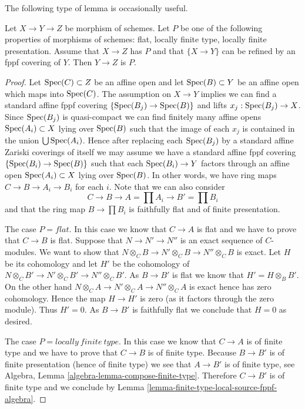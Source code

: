 \noindent
The following type of lemma is occasionally useful.

\begin{lemma}
\label{lemma-curiosity}
Let $X \to Y \to Z$ be morphism of schemes.
Let $P$ be one of the following properties of morphisms of schemes:
flat, locally finite type, locally finite presentation.
Assume that $X \to Z$ has $P$ and that $\{X \to Y\}$
can be refined by an fppf covering of $Y$. Then $Y \to Z$ is $P$.
\end{lemma}

\begin{proof}
Let $\mathop{\mathrm{Spec}}(C) \subset Z$ be an affine open and let
$\mathop{\mathrm{Spec}}(B) \subset Y$ be an affine open which maps into
$\mathop{\mathrm{Spec}}(C)$. The assumption on $X \to Y$ implies we can
find a standard affine fppf covering $\{\mathop{\mathrm{Spec}}(B_j) \to \mathop{\mathrm{Spec}}(B)\}$
and lifts $x_j : \mathop{\mathrm{Spec}}(B_j) \to X$. Since $\mathop{\mathrm{Spec}}(B_j)$
is quasi-compact we can find finitely many affine opens
$\mathop{\mathrm{Spec}}(A_i) \subset X$ lying over $\mathop{\mathrm{Spec}}(B)$
such that the image of each $x_j$
is contained in the union $\bigcup \mathop{\mathrm{Spec}}(A_i)$. Hence after
replacing each $\mathop{\mathrm{Spec}}(B_j)$ by a standard affine Zariski coverings
of itself we may assume we have a
standard affine fppf covering $\{\mathop{\mathrm{Spec}}(B_i) \to \mathop{\mathrm{Spec}}(B)\}$
such that each $\mathop{\mathrm{Spec}}(B_i) \to Y$ factors through an affine
open $\mathop{\mathrm{Spec}}(A_i) \subset X$ lying over $\mathop{\mathrm{Spec}}(B)$.
In other words, we have ring maps $C \to B \to A_i \to B_i$ for each $i$.
Note that we can also consider
$$
C \to B \to A = \prod A_i \to B' = \prod B_i
$$
and that the ring map $B \to \prod B_i$ is faithfully flat and
of finite presentation.

\medskip\noindent
The case $P = flat$. In this case we know that $C \to A$ is flat
and we have to prove that $C \to B$ is flat. Suppose that
$N \to N' \to N''$ is an exact sequence of $C$-modules. We want to
show that $N \otimes_C B \to N' \otimes_C B \to N'' \otimes_C B$
is exact. Let $H$ be its cohomology and let $H'$ be the cohomology
of $N \otimes_C B' \to N' \otimes_C B' \to N'' \otimes_C B'$. As
$B \to B'$ is flat we know that $H' = H \otimes_B B'$. On the other hand
$N \otimes_C A \to N' \otimes_C A \to N'' \otimes_C A$
is exact hence has zero cohomology. Hence the map
$H \to H'$ is zero (as it factors through the zero module).
Thus $H' = 0$. As $B \to B'$ is faithfully flat we conclude that
$H = 0$ as desired.

\medskip\noindent
The case $P = locally\ finite\ type$.
In this case we know that $C \to A$ is of finite type and
we have to prove that $C \to B$ is of finite type.
Because $B \to B'$ is of finite presentation (hence of finite type)
we see that $A \to B'$ is of finite type, see
Algebra, Lemma \ref{algebra-lemma-compose-finite-type}.
Therefore $C \to B'$ is of finite type and we conclude by
Lemma \ref{lemma-finite-type-local-source-fppf-algebra}.


\end{proof}
